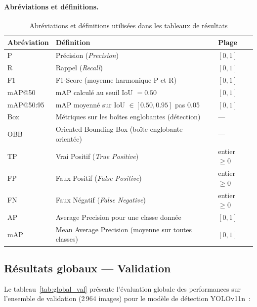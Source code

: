 \paragraph{Abréviations et définitions.}

\begin{table}[H]
\centering
\caption{Abréviations et définitions utilisées dans les tableaux de résultats}
\label{tab:abrev}
\begin{tabular}{lll}
\toprule
\textbf{Abréviation} & \textbf{Définition} & \textbf{Plage} \\
\midrule
P          & Précision (\textit{Precision})                        & $[0, 1]$ \\
R          & Rappel (\textit{Recall})                              & $[0, 1]$ \\
F1         & F1-Score (moyenne harmonique P et R)                  & $[0, 1]$ \\
mAP@50     & mAP calculé au seuil IoU $= 0.50$                    & $[0, 1]$ \\
mAP@50:95  & mAP moyenné sur IoU $\in [0.50, 0.95]$ pas 0.05      & $[0, 1]$ \\
Box        & Métriques sur les boîtes englobantes (détection)      & --- \\
OBB        & Oriented Bounding Box (boîte englobante orientée)     & --- \\
TP         & Vrai Positif (\textit{True Positive})                 & entier $\geq 0$ \\
FP         & Faux Positif (\textit{False Positive})                & entier $\geq 0$ \\
FN         & Faux Négatif (\textit{False Negative})                & entier $\geq 0$ \\
AP         & Average Precision pour une classe donnée              & $[0, 1]$ \\
mAP        & Mean Average Precision (moyenne sur toutes classes)   & $[0, 1]$ \\
\bottomrule
\end{tabular}
\end{table}

\subsection{Résultats globaux --- Validation}
\label{subsec:global_val}

Le tableau~\ref{tab:global_val} présente l'évaluation globale des performances
sur l'ensemble de validation (2\,964 images) pour le modèle de détection YOLOv11n~:

